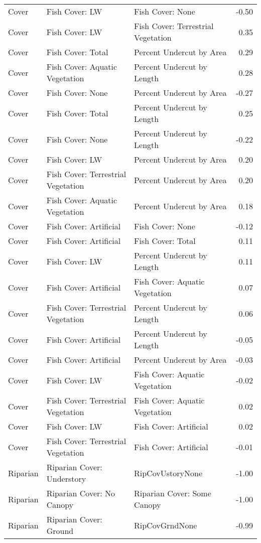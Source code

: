 \documentclass[
  12pt,
]{article}
\begin{document}
\begin{longtable}[t]{>{\raggedright\arraybackslash}p{1in}>{\raggedright\arraybackslash}p{2in}>{\raggedright\arraybackslash}p{2in}r}
Cover & Fish Cover: LW & Fish Cover: None & -0.50\\
Cover & Fish Cover: LW & Fish Cover: Terrestrial Vegetation & 0.35\\
\addlinespace
Cover & Fish Cover: Total & Percent Undercut by Area & 0.29\\
Cover & Fish Cover: Aquatic Vegetation & Percent Undercut by Length & 0.28\\
Cover & Fish Cover: None & Percent Undercut by Area & -0.27\\
Cover & Fish Cover: Total & Percent Undercut by Length & 0.25\\
Cover & Fish Cover: None & Percent Undercut by Length & -0.22\\
\addlinespace
Cover & Fish Cover: LW & Percent Undercut by Area & 0.20\\
Cover & Fish Cover: Terrestrial Vegetation & Percent Undercut by Area & 0.20\\
Cover & Fish Cover: Aquatic Vegetation & Percent Undercut by Area & 0.18\\
Cover & Fish Cover: Artificial & Fish Cover: None & -0.12\\
Cover & Fish Cover: Artificial & Fish Cover: Total & 0.11\\
\addlinespace
Cover & Fish Cover: LW & Percent Undercut by Length & 0.11\\
Cover & Fish Cover: Artificial & Fish Cover: Aquatic Vegetation & 0.07\\
Cover & Fish Cover: Terrestrial Vegetation & Percent Undercut by Length & 0.06\\
Cover & Fish Cover: Artificial & Percent Undercut by Length & -0.05\\
Cover & Fish Cover: Artificial & Percent Undercut by Area & -0.03\\
\addlinespace
Cover & Fish Cover: LW & Fish Cover: Aquatic Vegetation & -0.02\\
Cover & Fish Cover: Terrestrial Vegetation & Fish Cover: Aquatic Vegetation & 0.02\\
Cover & Fish Cover: LW & Fish Cover: Artificial & 0.02\\
Cover & Fish Cover: Terrestrial Vegetation & Fish Cover: Artificial & -0.01\\
\hline
Riparian & Riparian Cover: Understory & RipCovUstoryNone & -1.00\\
\addlinespace
Riparian & Riparian Cover: No Canopy & Riparian Cover: Some Canopy & -1.00\\
Riparian & Riparian Cover: Ground & RipCovGrndNone & -0.99\\

\end{longtable}
\end{document}
